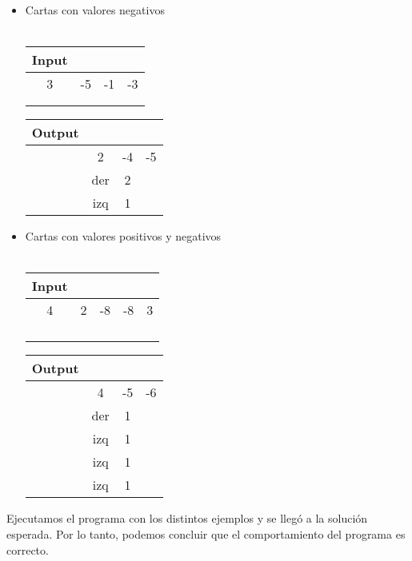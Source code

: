 \documentclass[11pt, a4paper, twoside]{article}
\begin{document}
\begin{enumerate}
\begin{itemize}
			\item Cartas con valores negativos \\	
			\\
				\begin{minipage}{0.4\textwidth}
					  \begin{tabular}{cccc}
						   Input \\
                           \hline
                        	3 & -5 & -1 & -3 \\
						   \\
						   \\
					  \end{tabular}
				\end{minipage} 
				\begin{minipage}{0.3\textwidth}
					  \begin{tabular}{cccc}
						  Output \\
                          \hline
                           & 2   & -4  & -5 \\
						   & der & 2  & \\
						   & izq & 1  & \\
					  \end{tabular}
				\end{minipage}
			
            \item Cartas con valores positivos y negativos \\
			\\
				\begin{minipage}{0.4\textwidth}
					  \begin{tabular}{ccccc}
						   Input\\
                           \hline
						   4 & 2 & -8 & -8 & 3 \\
						   \\
						   \\
						   \\
						   \\
					  \end{tabular}
				\end{minipage} 
				\begin{minipage}{0.3\textwidth}
					  \begin{tabular}{cccc}
					     Output \\
						 \hline	
						   & 4   & -5  & -6 \\
						   & der & 1  & \\
						   & izq & 1  & \\
						   & izq & 1  & \\
						   & izq & 1  & \\
					  \end{tabular}
				\end{minipage}				
				
		\end{itemize}
	
Ejecutamos el programa con los distintos ejemplos y se llegó a la solución esperada. 
Por lo tanto, podemos concluir que el comportamiento del programa es correcto. 
	
\end{enumerate}
\end{document}
